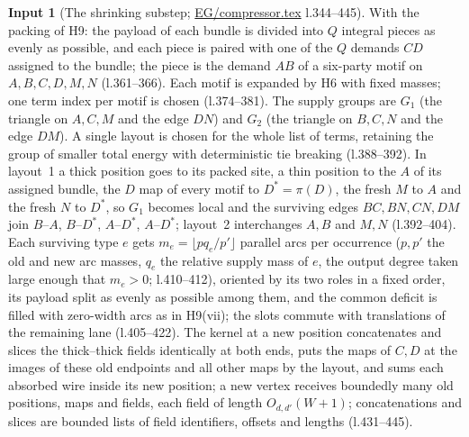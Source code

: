 \documentclass[11pt]{article}
\theoremstyle{definition}
\newtheorem{hyp}{Input}
\theoremstyle{remark}
\newcommand{\src}[1]{\url{#1}}
\begin{document}
\begin{hyp}[The shrinking substep; \src{EG/compressor.tex} l.344--445]\label{H10}
With the packing of H9: the payload of each bundle is divided into $Q$ integral pieces as evenly as possible, and each piece is
paired with one of the $Q$ demands $CD$ assigned to the bundle; the piece is the demand $AB$ of a six-party motif on
$A,B,C,D,M,N$ (l.361--366). Each motif is expanded by H6 with fixed masses; one term index per motif is chosen (l.374--381). The
supply groups are $G_1$ (the triangle on $A,C,M$ and the edge $DN$) and $G_2$ (the triangle on $B,C,N$ and the edge $DM$). A single
layout is chosen for the whole list of terms, retaining the group of smaller total energy with deterministic tie breaking
(l.388--392). In layout~1 a thick position goes to its packed site, a thin position to the $A$ of its assigned bundle, the $D$ map
of every motif to $D^*=\pi(D)$, the fresh $M$ to $A$ and the fresh $N$ to $D^*$, so $G_1$ becomes local and the surviving edges
$BC,BN,CN,DM$ join $B$--$A$, $B$--$D^*$, $A$--$D^*$, $A$--$D^*$; layout~2 interchanges $A,B$ and $M,N$ (l.392--404). Each
surviving type $e$ gets $m_e=\lfloor pq_e/p'\rfloor$ parallel arcs per occurrence ($p,p'$ the old and new arc masses, $q_e$ the
relative supply mass of $e$, the output degree taken large enough that $m_e>0$; l.410--412), oriented by its two roles in a fixed order, its payload split as evenly
as possible among them, and the common deficit is filled with zero-width arcs as in H9(vii); the slots commute with translations of
the remaining lane (l.405--422). The kernel at a new position concatenates and slices the thick--thick fields identically at both
ends, puts the maps of $C,D$ at the images of these old endpoints and all other maps by the layout, and sums each absorbed wire
inside its new position; a new vertex receives boundedly many old positions, maps and fields, each field of length
$O_{d,d'}(W+1)$; concatenations and slices are bounded lists of field identifiers, offsets and lengths (l.431--445).
\end{hyp}
\end{document}
